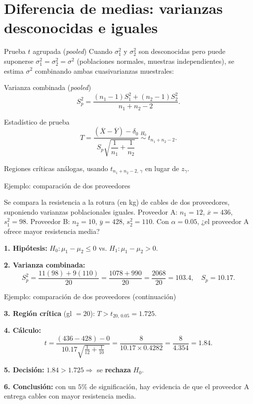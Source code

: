 \documentclass[aspectratio=169,11pt]{beamer}
\begin{document}
\section{Diferencia de medias: varianzas desconocidas e iguales}

\begin{frame}{Prueba $t$ agrupada (\emph{pooled})}
Cuando $\sigma_1^2$ y $\sigma_2^2$ son desconocidas pero puede suponerse $\sigma_1^2=\sigma_2^2=\sigma^2$ (poblaciones normales, muestras independientes), se estima $\sigma^2$ combinando ambas cuasivarianzas muestrales:

\begin{block}{Varianza combinada (\emph{pooled})}
\[
S_p^2 = \frac{(n_1-1)S_1^2+(n_2-1)S_2^2}{n_1+n_2-2}.
\]
\end{block}

\begin{block}{Estadístico de prueba}
\[
T=\frac{(\overline{X}-\overline{Y})-\delta_0}{S_p\sqrt{\dfrac{1}{n_1}+\dfrac{1}{n_2}}} \ \overset{H_0}{\sim}\ t_{n_1+n_2-2}.
\]
\end{block}

Regiones críticas análogas, usando $t_{n_1+n_2-2,\,\gamma}$ en lugar de $z_\gamma$.
\end{frame}

\begin{frame}{Ejemplo: comparación de dos proveedores}
\begin{example}
Se compara la resistencia a la rotura (en kg) de cables de dos proveedores, suponiendo varianzas poblacionales iguales. Proveedor A: $n_1=12$, $\overline{x}=436$, $s_1^2=98$. Proveedor B: $n_2=10$, $\overline{y}=428$, $s_2^2=110$. Con $\alpha=0.05$, ¿el proveedor A ofrece mayor resistencia media?

\textbf{1. Hipótesis:} $H_0:\mu_1-\mu_2\le0$ vs. $H_1:\mu_1-\mu_2>0$.

\textbf{2. Varianza combinada:}
\[
S_p^2=\frac{11(98)+9(110)}{20}=\frac{1078+990}{20}=\frac{2068}{20}=103.4, \quad S_p=10.17.
\]

\end{example}
\end{frame}

\begin{frame}{Ejemplo: comparación de dos proveedores (continuación)}
\begin{example}
\textbf{3. Región crítica} (gl $=20$): $T>t_{20,\,0.05}=1.725$.

\textbf{4. Cálculo:}
\[
t=\frac{(436-428)-0}{10.17\sqrt{\tfrac{1}{12}+\tfrac{1}{10}}}=\frac{8}{10.17\times0.4282}=\frac{8}{4.354}=1.84.
\]

\textbf{5. Decisión:} $1.84>1.725 \Rightarrow$ se \textbf{rechaza} $H_0$.

\textbf{6. Conclusión:} con un $5\%$ de significación, hay evidencia de que el proveedor A entrega cables con mayor resistencia media.
\end{example}
\end{frame}
\end{document}
